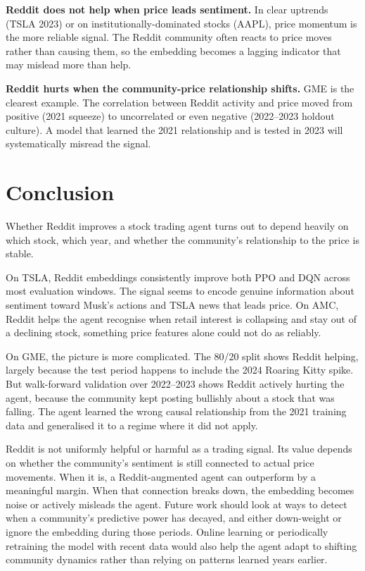 \documentclass[letterpaper,twocolumn]{article}
\begin{document}
\textbf{Reddit does not help when price leads sentiment.}
In clear uptrends (TSLA 2023) or on institutionally-dominated
stocks (AAPL), price momentum is the more reliable signal.
The Reddit community often reacts to price moves rather than
causing them, so the embedding becomes a lagging indicator
that may mislead more than help.

\textbf{Reddit hurts when the community-price relationship
shifts.}
GME is the clearest example.
The correlation between Reddit activity and price moved from
positive (2021 squeeze) to uncorrelated or even negative
(2022--2023 holdout culture).
A model that learned the 2021 relationship and is tested in
2023 will systematically misread the signal.

\section{Conclusion}

Whether Reddit improves a stock trading agent turns out to
depend heavily on which stock, which year, and whether the
community's relationship to the price is stable.

On TSLA, Reddit embeddings consistently improve both PPO and
DQN across most evaluation windows.
The signal seems to encode genuine information about
sentiment toward Musk's actions and TSLA news that leads
price.
On AMC, Reddit helps the agent recognise when retail interest
is collapsing and stay out of a declining stock, something
price features alone could not do as reliably.

On GME, the picture is more complicated.
The 80/20 split shows Reddit helping, largely because the
test period happens to include the 2024 Roaring Kitty spike.
But walk-forward validation over 2022--2023 shows Reddit
actively hurting the agent, because the community kept
posting bullishly about a stock that was falling.
The agent learned the wrong causal relationship from the 2021
training data and generalised it to a regime where it did not
apply.

Reddit is not uniformly helpful or harmful as a trading signal.
Its value depends on whether the community's sentiment is still
connected to actual price movements.
When it is, a Reddit-augmented agent can outperform by a
meaningful margin.
When that connection breaks down, the embedding becomes noise
or actively misleads the agent.
Future work should look at ways to detect when a community's
predictive power has decayed, and either down-weight or ignore
the embedding during those periods.
Online learning or periodically retraining the model with
recent data would also help the agent adapt to shifting
community dynamics rather than relying on patterns learned
years earlier.



\end{document}
